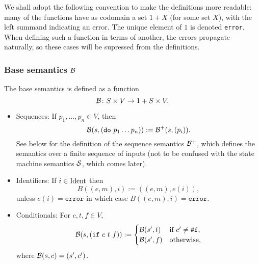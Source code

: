 We shall adopt the following convention to make the definitions more readable:
many of the functions have as codomain a set $1 + X$ (for some set $X$), with
the left summand indicating an error. The unique element of $1$ is denoted
\texttt{error}. When defining such a function in terms of another, the errors
propagate naturally, so these cases will be supressed from the definitions.

\subsubsection{Base semantics $\B$}

The base semantics is defined as a function
\[
\B \colon S \times V \to 1 + S \times V.
\]
\begin{itemize}
\item Sequences: If $p_1, \ldots, p_n \in V$, then
  \[
    \B(s, (\mathtt{do} \ p_1 \ldots p_n)) := \B^+(s, (p_i)).
  \]
  See below for the definition of the sequence semantics $\B^+$, which defines
  the semantics over a finite sequence of inputs (not to be confused with the
  state machine semantics $\S$, which comes later).
\item Identifiers: If $i \in \Ident$ then
  \[
    B((e,m), i) := ((e,m),e(i)),
  \]
  unless $e(i) = \mathtt{error}$ in which case $B((e,m), i) = \mathtt{error}$.
\item Conditionals: For $c,t,f \in V$,
  \[
    \B( s, (\mathtt{if} \ c \ t \ f)) :=
    \begin{cases}
      \B(s', t) & \text{if $c' \neq \texttt{\#}\mathtt{f}$,}\\
      \B(s', f) & \text{otherwise,}
    \end{cases}
  \]
  where $\B(s, c) = (s', c')$.


\end{itemize}
